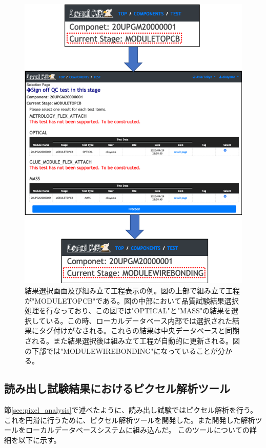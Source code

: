 \begin{figure}[bpt]\centering
\includegraphics[width=14cm]{./webapp_sign_off.png}
\caption[結果選択画面及び組み立て工程表示の例]{結果選択画面及び組み立て工程表示の例。図の上部で組み立て工程が"MODULETOPCB"である。図の中部において品質試験結果選択処理を行なっており、この図では"OPTICAL"と"MASS"の結果を選択している。この時、ローカルデータベース内部では選択された結果にタグ付けがなされる。これらの結果は中央データベースと同期される。また結果選択後は組み立て工程が自動的に更新される。図の下部では"MODULEWIREBONDING"になっていることが分かる。}
\label{webapp_sign_off}
\end{figure}

\clearpage

\newpage
\subsection{読み出し試験結果におけるピクセル解析ツール}
節\ref{sec:pixel_analysis}で述べたように、読み出し試験ではピクセル解析を行う。
これを円滑に行うために、ピクセル解析ツールを開発した。また開発した解析ツールをローカルデータベースシステムに組み込んだ。
このツールについての詳細を以下に示す。


